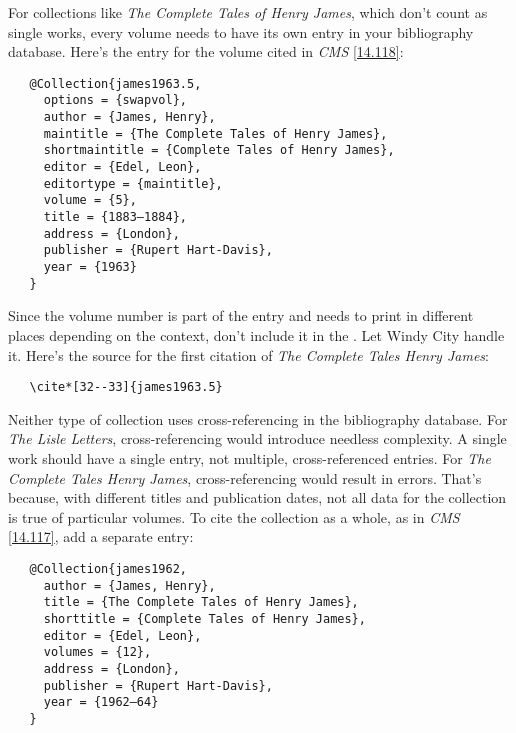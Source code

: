 \documentclass[11pt,letterpaper,oneside]{article}
\begin{document}
\begin{citeonly}
\item \cite{byrne1981}
\item \cite{byrne1981}
\end{citeonly}

For collections like \textit{The Complete Tales of Henry James}, which
don't count as single works, every volume needs to have its own entry
in your bibliography database. Here's the entry for the volume cited
in \textit{CMS} \ref{14.118}:

\begin{verbatim}
   @Collection{james1963.5,
     options = {swapvol},
     author = {James, Henry},
     maintitle = {The Complete Tales of Henry James},
     shortmaintitle = {Complete Tales of Henry James},
     editor = {Edel, Leon},
     editortype = {maintitle},
     volume = {5},
     title = {1883–1884},
     address = {London},
     publisher = {Rupert Hart-Davis},
     year = {1963}
   }
\end{verbatim}

Since the volume number is part of the entry and needs to print in
different places depending on the context, don't include it in the
. Let Windy City handle it. Here's the source for
the first citation of \textit{The Complete Tales Henry James}:

\begin{verbatim}
   \cite*[32--33]{james1963.5}
\end{verbatim}

Neither type of collection uses cross-referencing in the bibliography
database. For \textit{The Lisle Letters}, cross-referencing would
introduce needless complexity. A single work should have a single
entry, not multiple, cross-referenced entries. For \textit{The
Complete Tales Henry James}, cross-referencing would result in errors.
That's because, with different titles and publication dates, not all
data for the collection is true of particular volumes. To cite the
collection as a whole, as in \textit{CMS} \ref{14.117}, add a separate
entry:

\begin{verbatim}
   @Collection{james1962,
     author = {James, Henry},
     title = {The Complete Tales of Henry James},
     shorttitle = {Complete Tales of Henry James},
     editor = {Edel, Leon},
     volumes = {12},
     address = {London},
     publisher = {Rupert Hart-Davis},
     year = {1962–64}
   }
\end{verbatim}
\end{document}
